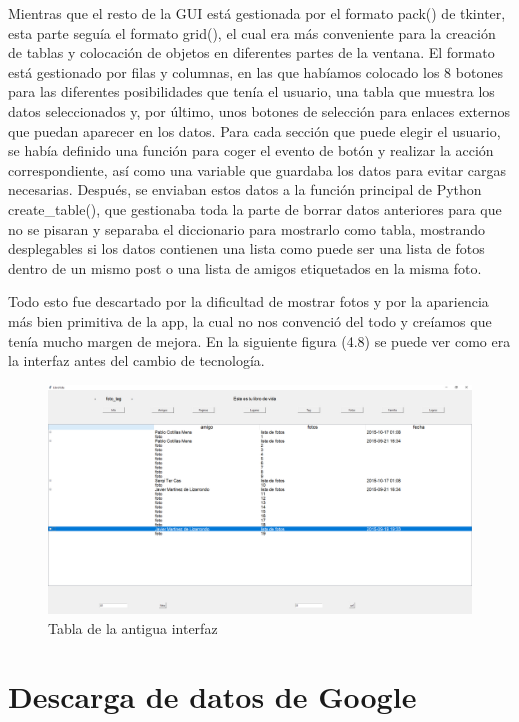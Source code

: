 Mientras que el resto de la GUI está gestionada por el formato pack() de tkinter, esta parte seguía el formato grid(), el cual era más conveniente para la creación de tablas y colocación de objetos en diferentes partes de la ventana. El formato está gestionado por filas y columnas, en las que habíamos colocado los 8 botones para las diferentes posibilidades que tenía el usuario, una tabla que muestra los datos seleccionados y, por último, unos botones de selección para enlaces externos que puedan aparecer en los datos. Para cada sección que puede elegir el usuario, se había definido una función para coger el evento de botón y realizar la acción correspondiente, así como una variable que guardaba los datos para evitar cargas necesarias. Después, se enviaban estos datos a la función principal de Python create\_table(), que gestionaba toda la parte de borrar datos anteriores para que no se pisaran y separaba el diccionario para mostrarlo como tabla, mostrando desplegables si los datos contienen una lista como puede ser una lista de fotos dentro de un mismo post o una lista de amigos etiquetados en la misma foto.

Todo esto fue descartado por la dificultad de mostrar fotos y por la apariencia más bien primitiva de la app, la cual no nos convenció del todo y creíamos que tenía mucho margen de mejora. En la siguiente figura (4.8) se puede ver como era la interfaz antes del cambio de tecnología.

\begin{figure}
	\begin{center}
		\includegraphics[scale=0.25]{Imagenes/Fuentes/tablasFoto.png} 
		\caption{Tabla de la antigua interfaz}
		\label{Tinicial}
	\end{center}
\end{figure}
\newpage
 
\section{Descarga de datos de Google}


